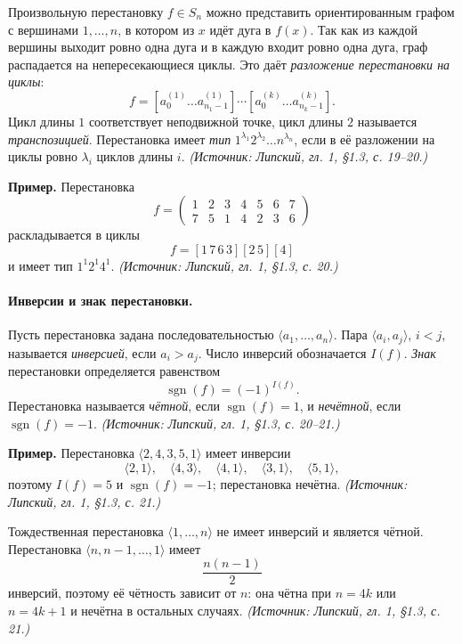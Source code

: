 \documentclass[a4paper,12pt]{article}
\begin{document}
Произвольную перестановку \(f\in S_n\) можно представить ориентированным графом с вершинами \(1,\dots,n\), в котором из \(x\) идёт дуга в \(f(x)\). Так как из каждой вершины выходит ровно одна дуга и в каждую входит ровно одна дуга, граф распадается на непересекающиеся циклы. Это даёт \emph{разложение перестановки на циклы}:
\[
f=[a_0^{(1)}\dots a_{n_1-1}^{(1)}]\cdots[a_0^{(k)}\dots a_{n_k-1}^{(k)}].
\]
Цикл длины \(1\) соответствует неподвижной точке, цикл длины \(2\) называется \emph{транспозицией}. Перестановка имеет \emph{тип} \(1^{\lambda_1}2^{\lambda_2}\dots n^{\lambda_n}\), если в её разложении на циклы ровно \(\lambda_i\) циклов длины \(i\).
\textit{(Источник: Липский, гл. 1, §1.3, с. 19--20.)}

\textbf{Пример.} Перестановка
\[
f=
\begin{pmatrix}
1 & 2 & 3 & 4 & 5 & 6 & 7\\
7 & 5 & 1 & 4 & 2 & 3 & 6
\end{pmatrix}
\]
раскладывается в циклы
\[
f=[1\,7\,6\,3][2\,5][4]
\]
и имеет тип \(1^1 2^1 4^1\).
\textit{(Источник: Липский, гл. 1, §1.3, с. 20.)}

\paragraph{Инверсии и знак перестановки.}
Пусть перестановка задана последовательностью \(\langle a_1,\dots,a_n\rangle\). Пара \(\langle a_i,a_j\rangle\), \(i<j\), называется \emph{инверсией}, если \(a_i>a_j\). Число инверсий обозначается \(I(f)\). \emph{Знак} перестановки определяется равенством
\[
\operatorname{sgn}(f)=(-1)^{I(f)}.
\]
Перестановка называется \emph{чётной}, если \(\operatorname{sgn}(f)=1\), и \emph{нечётной}, если \(\operatorname{sgn}(f)=-1\).
\textit{(Источник: Липский, гл. 1, §1.3, с. 20--21.)}

\textbf{Пример.} Перестановка \(\langle 2,4,3,5,1\rangle\) имеет инверсии
\[
\langle 2,1\rangle,\quad \langle 4,3\rangle,\quad \langle 4,1\rangle,\quad \langle 3,1\rangle,\quad \langle 5,1\rangle,
\]
поэтому \(I(f)=5\) и \(\operatorname{sgn}(f)=-1\); перестановка нечётна.
\textit{(Источник: Липский, гл. 1, §1.3, с. 21.)}

Тождественная перестановка \(\langle 1,\dots,n\rangle\) не имеет инверсий и является чётной. Перестановка \(\langle n,n-1,\dots,1\rangle\) имеет
\[
\frac{n(n-1)}2
\]
инверсий, поэтому её чётность зависит от \(n\): она чётна при \(n=4k\) или \(n=4k+1\) и нечётна в остальных случаях.
\textit{(Источник: Липский, гл. 1, §1.3, с. 21.)}
\end{document}
